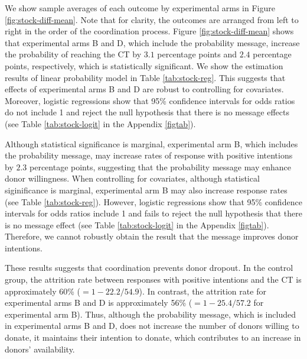\documentclass[12pt, a4paper]{article}
\begin{document}
We show sample averages of each outcome by experimental arms in Figure \ref{fig:stock-diff-mean}. Note that for clarity, the outcomes are arranged from left to right in the order of the coordination process. Figure \ref{fig:stock-diff-mean} shows that experimental arms B and D, which include the probability message, increase the probability of reaching the CT by \(3.1\) percentage points and \(2.4\) percentage points, respectively, which is statistically significant. We show the estimation results of linear probability model in Table \ref{tab:stock-reg}. This suggests that effects of experimental arms B and D are robust to controlling for covariates. Moreover, logistic regressions show that 95\% confidence intervals for odds ratios do not include 1 and reject the null hypothesis that there is no message effects (see Table \ref{tab:stock-logit} in the Appendix \ref{figtab}).

Although statistical significance is marginal, experimental arm B, which includes the probability message, may increase rates of response with positive intentions by \(2.3\) percentage points, suggesting that the probability message may enhance donor willingness. When controlling for covariates, although statistical siginificance is marginal, experimental arm B may also increase response rates (see Table \ref{tab:stock-reg}). However, logistic regressions show that 95\% confidence intervals for odds ratios include 1 and fails to reject the null hypothesis that there is no message effect (see Table \ref{tab:stock-logit} in the Appendix \ref{figtab}). Therefore, we cannot robustly obtain the result that the message improves donor intentions.

These results suggests that coordination prevents donor dropout. In the control group, the attrition rate between responses with positive intentions and the CT is approximately 60\% (\(=1 - 22.2/54.9\)). In contrast, the attrition rate for experimental arms B and D is approximately 56\% (\(=1 - 25.4/57.2\) for experimental arm B). Thus, although the probability message, which is included in experimental arms B and D, does not increase the number of donors willing to donate, it maintains their intention to donate, which contributes to an increase in donors' availability.
\end{document}
